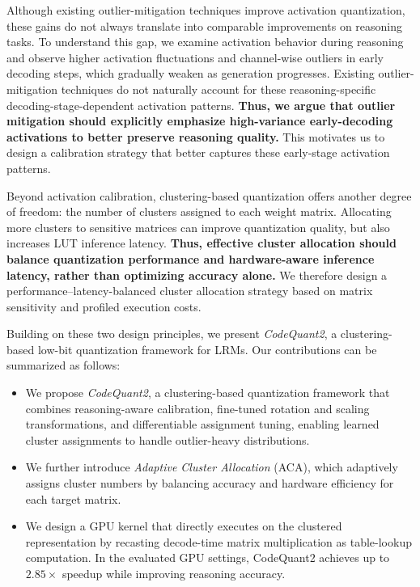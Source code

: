 \documentclass{article}
\begin{document}
Although existing outlier-mitigation techniques improve activation quantization, these gains do not always translate into comparable improvements on reasoning tasks. To understand this gap, we examine activation behavior during reasoning and observe higher activation fluctuations and channel-wise outliers in early decoding steps, which gradually weaken as generation progresses. Existing outlier-mitigation techniques do not naturally account for these reasoning-specific decoding-stage-dependent activation patterns. \textbf{Thus, we argue that outlier mitigation should explicitly emphasize high-variance early-decoding activations to better preserve reasoning quality.} This motivates us to design a calibration strategy that better captures these early-stage activation patterns.

Beyond activation calibration, clustering-based quantization offers another degree of freedom: the number of clusters assigned to each weight matrix. Allocating more clusters to sensitive matrices can improve quantization quality, but also increases LUT inference latency. \textbf{Thus, effective cluster allocation should balance quantization performance and hardware-aware inference latency, rather than optimizing accuracy alone.} We therefore design a performance--latency-balanced cluster allocation strategy based on matrix sensitivity and profiled execution costs.

Building on these two design principles, we present \textit{CodeQuant2}, a clustering-based low-bit quantization framework for LRMs. Our contributions can be summarized as follows:
\begin{itemize}
    \item We propose \textit{CodeQuant2}, a clustering-based quantization framework that combines reasoning-aware calibration, fine-tuned rotation and scaling transformations, and differentiable assignment tuning, enabling learned cluster assignments to handle outlier-heavy distributions.
    \item We further introduce \textit{Adaptive Cluster Allocation} (ACA), which adaptively assigns cluster numbers by balancing accuracy and hardware efficiency for each target matrix.
    \item We design a GPU kernel that directly executes on the clustered representation by recasting decode-time matrix multiplication as table-lookup computation. In the evaluated GPU settings, CodeQuant2 achieves up to \(2.85\times\) speedup while improving reasoning accuracy.
\end{itemize}
\end{document}
